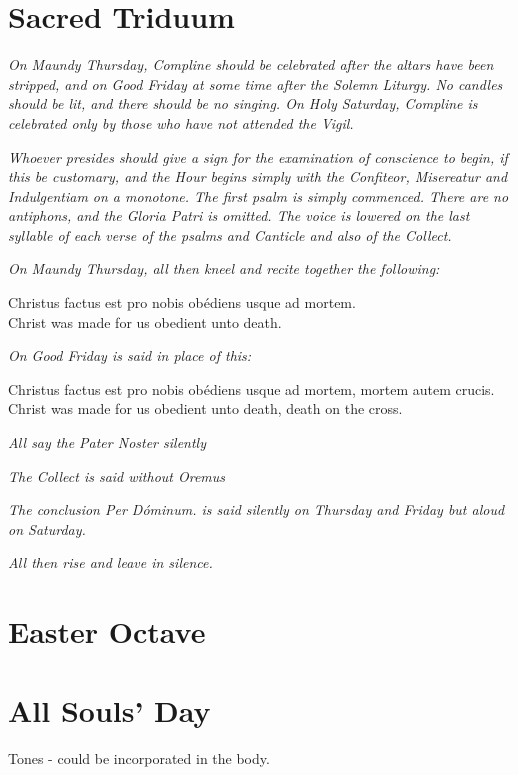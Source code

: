\documentclass[a5paper,12pt,twoside,openany]{memoir}
\def\latin#1{\selectlanguage{latin}#1\selectlanguage{british}\\}
\def\vern#1{{\inglesh \fontsize{14}{11}\selectfont #1}\par}
\def\startParallel{}
\def\stopParallel{}
\newcommand\rubrics[1]{\textit{#1}}
\begin{document}
\chapter{Sacred Triduum}

\rubrics{On Maundy Thursday, Compline should be celebrated after the altars have been stripped, and on Good Friday at some time after the Solemn Liturgy.  No candles should be lit, and there should be no singing.  On Holy Saturday, Compline is celebrated only by those who have not attended the Vigil.}

\rubrics{Whoever presides should give a sign for the examination of conscience to begin, if this be customary, and the Hour begins simply with the Confiteor, Misereatur and Indulgentiam on a monotone.  The first psalm is simply commenced. There are no antiphons, and the Gloria Patri is omitted.  The voice is lowered on the last syllable of each verse of the psalms and Canticle and also of the Collect.}

\rubrics{On Maundy Thursday, all then kneel and recite together the following: }

\startParallel
\latin{Christus factus est pro nobis obédiens usque ad mortem.}
\vern{Christ was made for us obedient unto death.}
\stopParallel

\rubrics{On Good Friday is said in place of this:}

\startParallel
\latin{Christus factus est pro nobis obédiens usque ad mortem, mortem autem crucis.}
\vern{Christ was made for us obedient unto death, death on the cross.}
\stopParallel

\rubrics{All say the Pater Noster silently}

\rubrics{The Collect is said without Oremus}

\rubrics{The conclusion \emph{Per Dóminum.} is said silently on Thursday and Friday but aloud on Saturday.}

\rubrics{All then rise and leave in silence.}

\chapter{Easter Octave}

\chapter{All Souls' Day}

Tones - could be incorporated in the body.
\end{document}
